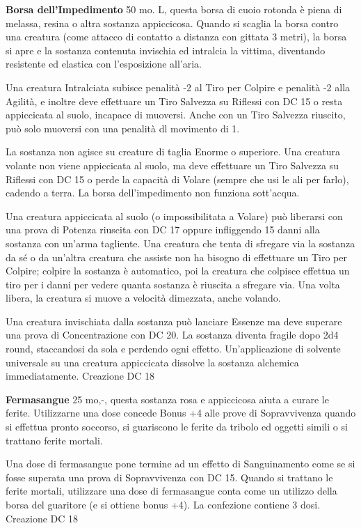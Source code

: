 \documentclass[a4paper,11pt,twoside,openany]{book}
\begin{document}
{\textbf{Borsa dell'Impedimento} 50 mo. L, questa borsa di cuoio rotonda è piena di melassa, resina o altra sostanza appiccicosa. Quando si scaglia la borsa contro una creatura (come attacco di contatto a distanza con gittata 3 metri), la borsa si apre e la sostanza contenuta invischia ed intralcia la vittima, diventando resistente ed elastica con l'esposizione all'aria.

Una creatura Intralciata subisce penalità -2 al Tiro per Colpire e penalità -2 alla Agilità, e inoltre deve effettuare un Tiro Salvezza su Riflessi con DC 15 o resta appiccicata al suolo, incapace di muoversi. Anche con un Tiro Salvezza riuscito, può solo muoversi con una penalità dl movimento di 1.

La sostanza non agisce su creature di taglia Enorme o superiore. Una creatura volante non viene appiccicata al suolo, ma deve effettuare un Tiro Salvezza su Riflessi con DC 15 o perde la capacità di Volare (sempre che usi le ali per farlo), cadendo a terra. La borsa dell'impedimento non funziona sott'acqua.

Una creatura appiccicata al suolo (o impossibilitata a Volare) può liberarsi con una prova di Potenza riuscita con DC 17 oppure infliggendo 15 danni alla sostanza con un'arma tagliente. Una creatura che tenta di sfregare via la sostanza da sé o da un'altra creatura che assiste non ha bisogno di effettuare un Tiro per Colpire; colpire la sostanza è automatico, poi la creatura che colpisce effettua un tiro per i danni per vedere quanta sostanza è riuscita a sfregare via. Una volta libera, la creatura si muove a velocità dimezzata, anche volando.

Una creatura invischiata dalla sostanza può lanciare Essenze ma deve superare una prova di Concentrazione con DC 20. La sostanza diventa fragile dopo 2d4 round, staccandosi da sola e perdendo ogni effetto. Un'applicazione di solvente universale su una creatura appiccicata dissolve la sostanza alchemica immediatamente. Creazione DC 18

\textbf{Fermasangue} 25 mo,-, questa sostanza rosa e appiccicosa aiuta a curare le ferite. Utilizzarne una dose concede Bonus +4 alle prove di Sopravvivenza quando si effettua pronto soccorso, si guariscono le ferite da tribolo ed oggetti simili o si trattano ferite mortali. 

Una dose di fermasangue pone termine ad un effetto di Sanguinamento come se si fosse superata una prova di Sopravvivenza con DC 15. Quando si trattano le ferite mortali, utilizzare una dose di fermasangue conta come un utilizzo della borsa del guaritore (e si ottiene bonus +4). La confezione contiene 3 dosi. Creazione DC 18

}
\end{document}
